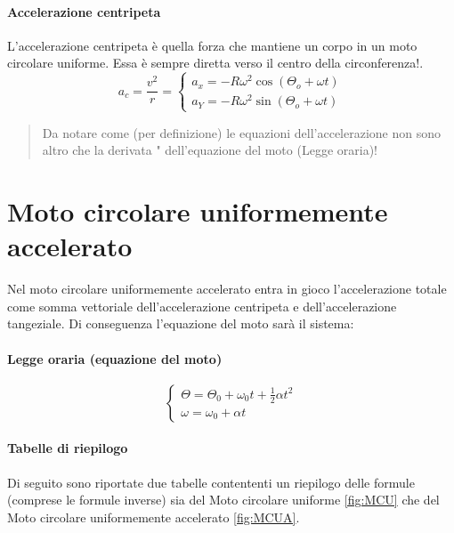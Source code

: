         \paragraph{Accelerazione centripeta} L'accelerazione centripeta è 
        quella forza che mantiene un corpo in un moto circolare uniforme. Essa
        è sempre diretta verso il centro della circonferenza!.
        \begin{equation}
            a_c = \frac{v^2}{r}=
            \begin{cases}
                a_x=-R\omega^2\cos{(\Theta_o+\omega t)} \\
                a_Y=-R\omega^2\sin{(\Theta_o+\omega t)}\end{cases}
        \end{equation}

        \begin{quote}
            Da notare come (per definizione) le equazioni dell'accelerazione non 
            sono altro che la derivata " dell'equazione del moto (Legge oraria)! 
        \end{quote}
        
    \section{Moto circolare uniformemente accelerato} Nel moto circolare 
    uniformemente accelerato entra in gioco l'accelerazione totale come somma
    vettoriale dell'accelerazione centripeta e dell'accelerazione tangeziale.
    Di conseguenza l'equazione del moto sarà il sistema:

        \paragraph{Legge oraria (equazione del moto)}
        \begin{equation}
            \begin{cases} 
                \Theta = \Theta_0 + \omega_0t + \frac{1}{2}\alpha t^2 \\ 
                \omega = \omega_0+\alpha t
            \end{cases}
        \end{equation}

        \paragraph{Tabelle di riepilogo} Di seguito sono riportate due tabelle 
        contententi un riepilogo delle formule (comprese le formule inverse) sia
        del Moto circolare uniforme \ref{fig:MCU} che del Moto circolare 
        uniformemente accelerato \ref{fig:MCUA}.

